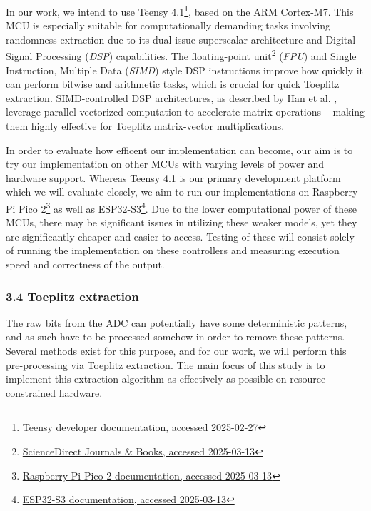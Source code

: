 In our work, we intend to use Teensy 4.1\footnote{\href{https://www.pjrc.com/store/teensy41.html}{Teensy developer documentation, accessed 2025-02-27}}, based on the ARM Cortex-M7. This MCU is especially suitable for computationally demanding tasks involving randomness extraction due to its dual-issue superscalar architecture and Digital Signal Processing (\emph{DSP}) capabilities. The floating-point unit\footnote{\href{https://www.sciencedirect.com/topics/computer-science/floating-point-unit}{ScienceDirect Journals \& Books, accessed 2025-03-13}} (\emph{FPU}) and Single Instruction, Multiple Data (\emph{SIMD}) style DSP instructions improve how quickly it can perform bitwise and arithmetic tasks, which is crucial for quick Toeplitz extraction. SIMD-controlled DSP architectures, as described by Han et al. \cite{simd-dsp}, leverage parallel vectorized computation to accelerate matrix operations -- making them highly effective for Toeplitz matrix-vector multiplications.

In order to evaluate how efficent our implementation can become, our aim is to try our implementation on other MCUs with varying levels of power and hardware support. Whereas Teensy 4.1 is our primary development platform which we will evaluate closely, we aim to run our implementations on Raspberry Pi Pico 2\footnote{\href{https://datasheets.raspberrypi.com/pico/pico-2-product-brief.pdf}{Raspberry Pi Pico 2 documentation, accessed 2025-03-13}} as well as ESP32-S3\footnote{\href{https://www.espressif.com/sites/default/files/documentation/esp32-s3_datasheet_en.pdf}{ESP32-S3 documentation, accessed 2025-03-13}}. Due to the lower computational power of these MCUs, there may be significant issues in utilizing these weaker models, yet they are significantly cheaper and easier to access. Testing of these will consist solely of running the implementation on these controllers and measuring execution speed and correctness of the output.

\hypertarget{toeplitz-extraction}{%
\subsubsection{3.4 Toeplitz extraction}\label{toeplitz-extraction}}

The raw bits from the ADC can potentially have some deterministic patterns, and as such have to be processed somehow in order to remove these patterns. Several methods exist for this purpose, and for our work, we will perform this pre-processing via Toeplitz extraction. The main focus of this study is to implement this extraction algorithm as effectively as possible on resource constrained hardware.

